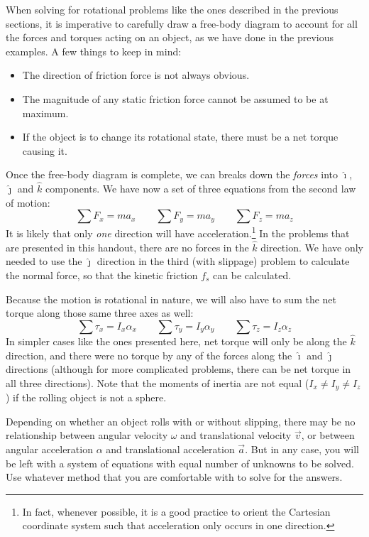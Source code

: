 \documentclass{../../oss-handout}
\newcommand{\iii}{\hat\imath}
\newcommand{\jjj}{\hat\jmath}
\newcommand{\kkk}{\hat k}
\begin{document}
When solving for rotational problems like the ones described in the previous
sections, it is imperative to carefully draw a free-body diagram to account for
all the forces and torques acting on an object, as we have done in the previous
examples. A few things to keep in mind:
\begin{itemize}[noitemsep,topsep=0pt]
\item The direction of friction force is not always obvious.
\item The magnitude of any static friction force cannot be assumed to be at
  maximum.
\item If the object is to change its rotational state, there must be a net
  torque causing it.
\end{itemize}
Once the free-body diagram is
complete, we can breaks down the \emph{forces} into $\iii$, $\jjj$ and $\kkk$
components. We have now a set of three equations from the second law of motion:
\begin{equation*}
  \sum F_x=ma_x\quad\quad \sum F_y=ma_y\quad\quad \sum F_z=ma_z
\end{equation*}
It is likely that only \emph{one} direction will have acceleration.\footnote{In
  fact, whenever possible, it is a good practice to orient the Cartesian
  coordinate system such that acceleration only occurs in one direction.} In
the problems that are presented in this handout, there are no forces in the
$\kkk$ direction. We have only needed to use the $\jjj$ direction in the third
(with slippage) problem to calculate the normal force, so that the kinetic
friction $f_s$ can be calculated.

Because the motion is rotational in nature, we will also have to sum the net
torque along those same three axes as well:
\begin{equation*}
  \sum\tau_x=I_x\alpha_x\quad\quad \sum\tau_y=I_y\alpha_y\quad\quad 
  \sum\tau_z=I_z\alpha_z
\end{equation*}
In simpler cases like the ones presented here, net torque will only be along
the $\kkk$ direction, and there were no torque by any of the forces along the
$\iii$ and $\jjj$ directions (although for more complicated problems, there can
be net torque in all three directions). Note that the moments of inertia are
not equal ($I_x\neq I_y\neq I_z$) if the rolling object is not a sphere.

Depending on whether an object rolls with or without slipping, there may be
no relationship between angular velocity $\omega$ and translational velocity
$\vec v$, or between angular acceleration $\alpha$ and translational
acceleration $\vec a$. But in any case, you will be left with a system of
equations with equal number of unknowns to be solved. Use whatever method that
you are comfortable with to solve for the answers.
\end{document}
